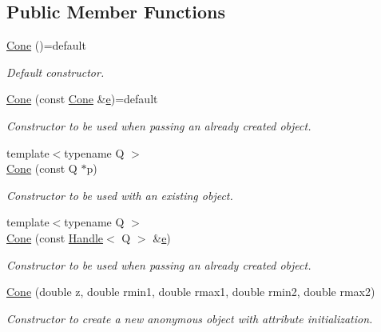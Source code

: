 \subsection*{Public Member Functions}
\begin{DoxyCompactItemize}
\item 
\hyperlink{class_d_d4hep_1_1_geometry_1_1_cone_ad4ad806a987019631449f18f0bc42425}{Cone} ()=default
\begin{DoxyCompactList}\small\item\em Default constructor. \end{DoxyCompactList}\item 
\hyperlink{class_d_d4hep_1_1_geometry_1_1_cone_af9007c2bd28a81b9708feebe8b8ac249}{Cone} (const \hyperlink{class_d_d4hep_1_1_geometry_1_1_cone}{Cone} \&\hyperlink{_volumes_8cpp_a8a9a1f93e9b09afccaec215310e64142}{e})=default
\begin{DoxyCompactList}\small\item\em Constructor to be used when passing an already created object. \end{DoxyCompactList}\item 
{\footnotesize template$<$typename Q $>$ }\\\hyperlink{class_d_d4hep_1_1_geometry_1_1_cone_a064cb39d46e1c66c6e596e60697a10fe}{Cone} (const Q $\ast$p)
\begin{DoxyCompactList}\small\item\em Constructor to be used with an existing object. \end{DoxyCompactList}\item 
{\footnotesize template$<$typename Q $>$ }\\\hyperlink{class_d_d4hep_1_1_geometry_1_1_cone_a897427f767f40ea1443ab927a6893f89}{Cone} (const \hyperlink{class_d_d4hep_1_1_handle}{Handle}$<$ Q $>$ \&\hyperlink{_volumes_8cpp_a8a9a1f93e9b09afccaec215310e64142}{e})
\begin{DoxyCompactList}\small\item\em Constructor to be used when passing an already created object. \end{DoxyCompactList}\item 
\hyperlink{class_d_d4hep_1_1_geometry_1_1_cone_a88d9236d88f467a6a17b1b729cf54afa}{Cone} (double z, double rmin1, double rmax1, double rmin2, double rmax2)
\begin{DoxyCompactList}\small\item\em Constructor to create a new anonymous object with attribute initialization. \end{DoxyCompactList}\item 

\end{DoxyCompactItemize}
